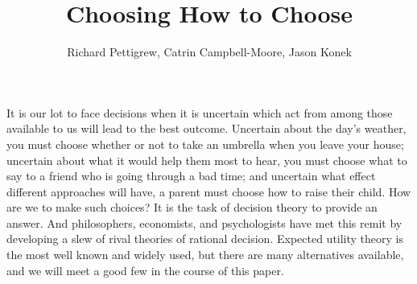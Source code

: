 \documentclass[a4paper,final]{article}
\newcommand{\todoold}[2][]{\todo[backgroundcolor=white,bordercolor=orange!10,linecolor=gray!10, #1,caption={},textcolor=gray]{Pre-rev: #2}}
\newcommand{\todooldinfo}[2][]{\todoold[#1]{#2}}
\newenvironment{CCM rewritten}
{\begingroup\color{blue}} %
{\endgroup}              %
\begin{document}
\title{Choosing How to Choose}
\author{Richard Pettigrew, Catrin Campbell-Moore, Jason Konek}
\maketitle

It is our lot to face decisions when it is uncertain which act from among those available to us will lead to the best outcome. Uncertain about the day's weather, you must choose whether or not to take an umbrella when you leave your house; uncertain about what it would help them most to hear, you must choose what to say to a friend who is going through a bad time; and uncertain what effect different approaches will have, a parent must choose how to raise their child. How are we to make such choices? It is the task of decision theory to provide an answer. And philosophers, economists, and psychologists have met this remit by developing a slew of rival theories of rational decision. Expected utility theory is the most well known and widely used, but there are many alternatives available, and we will meet a good few in the course of this paper.
\end{document}
